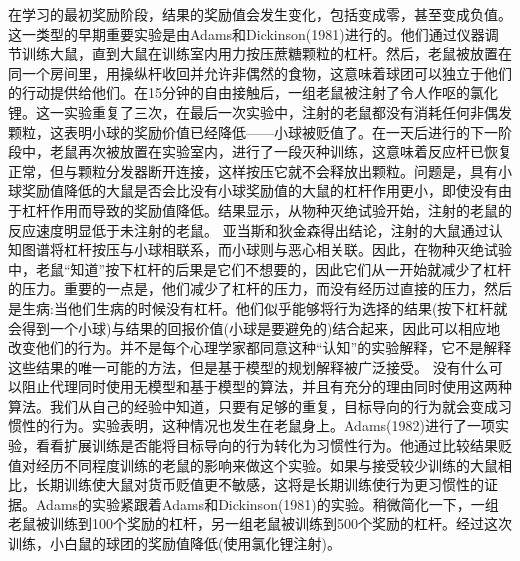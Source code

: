 在学习的最初奖励阶段，结果的奖励值会发生变化，包括变成零，甚至变成负值。
这一类型的早期重要实验是由Adams和Dickinson(1981)进行的。他们通过仪器调节训练大鼠，直到大鼠在训练室内用力按压蔗糖颗粒的杠杆。然后，老鼠被放置在同一个房间里，用操纵杆收回并允许非偶然的食物，这意味着球团可以独立于他们的行动提供给他们。在15分钟的自由接触后，一组老鼠被注射了令人作呕的氯化锂。这一实验重复了三次，在最后一次实验中，注射的老鼠都没有消耗任何非偶发颗粒，这表明小球的奖励价值已经降低——小球被贬值了。在一天后进行的下一阶段中，老鼠再次被放置在实验室内，进行了一段灭种训练，这意味着反应杆已恢复正常，但与颗粒分发器断开连接，这样按压它就不会释放出颗粒。问题是，具有小球奖励值降低的大鼠是否会比没有小球奖励值的大鼠的杠杆作用更小，即使没有由于杠杆作用而导致的奖励值降低。结果显示，从物种灭绝试验开始，注射的老鼠的反应速度明显低于未注射的老鼠。
亚当斯和狄金森得出结论，注射的大鼠通过认知图谱将杠杆按压与小球相联系，而小球则与恶心相关联。因此，在物种灭绝试验中，老鼠“知道”按下杠杆的后果是它们不想要的，因此它们从一开始就减少了杠杆的压力。重要的一点是，他们减少了杠杆的压力，而没有经历过直接的压力，然后是生病:当他们生病的时候没有杠杆。他们似乎能够将行为选择的结果(按下杠杆就会得到一个小球)与结果的回报价值(小球是要避免的)结合起来，因此可以相应地改变他们的行为。并不是每个心理学家都同意这种“认知”的实验解释，它不是解释这些结果的唯一可能的方法，但是基于模型的规划解释被广泛接受。
没有什么可以阻止代理同时使用无模型和基于模型的算法，并且有充分的理由同时使用这两种算法。我们从自己的经验中知道，只要有足够的重复，目标导向的行为就会变成习惯性的行为。实验表明，这种情况也发生在老鼠身上。Adams(1982)进行了一项实验，看看扩展训练是否能将目标导向的行为转化为习惯性行为。他通过比较结果贬值对经历不同程度训练的老鼠的影响来做这个实验。如果与接受较少训练的大鼠相比，长期训练使大鼠对货币贬值更不敏感，这将是长期训练使行为更习惯性的证据。Adams的实验紧跟着Adams和Dickinson(1981)的实验。稍微简化一下，一组老鼠被训练到100个奖励的杠杆，另一组老鼠被训练到500个奖励的杠杆。经过这次训练，小白鼠的球团的奖励值降低(使用氯化锂注射)。

